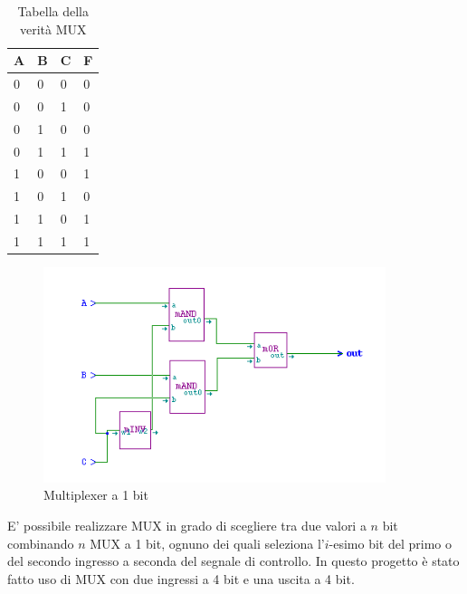 \documentclass[10pt]{article}
\begin{document}
\begin{itemize}
\begin{table}[H]
    \begin{minipage}[b]{\textwidth}
    \centering
        \begin{tabular}{|lll|l|}
        \hline
        \textbf{A} & \textbf{B} & \textbf{C} & \textbf{F} \\ \hline
        0          & 0          & 0          & 0          \\ 
        0          & 0          & 1          & 0          \\ 
        0          & 1          & 0          & 0          \\ 
        0          & 1          & 1          & 1          \\ 
        1          & 0          & 0          & 1          \\ 
        1          & 0          & 1          & 0          \\ 
        1          & 1          & 0          & 1          \\ 
        1          & 1          & 1          & 1          \\ \hline
        \end{tabular}
        \caption{Tabella della verità MUX}
        \label{tab:my-table}
    \end{minipage}
    \end{table}
    
    \begin{figure}[H]
    \begin{minipage}[b]{\textwidth}
    \centering
    \includegraphics[width=100mm]{mux1}
    \caption{Multiplexer a 1 bit}
    \label{ }
    \end{minipage}
    \end{figure}

E' possibile realizzare MUX in grado di scegliere tra due valori a $n$ bit combinando $n$ MUX a 1 bit, ognuno dei quali seleziona
l'$i$-esimo bit del primo o del secondo ingresso a seconda del segnale di controllo. In questo progetto è stato fatto uso di MUX con due ingressi a 4 bit e una uscita a 4 bit. 


\end{itemize}
\end{document}
